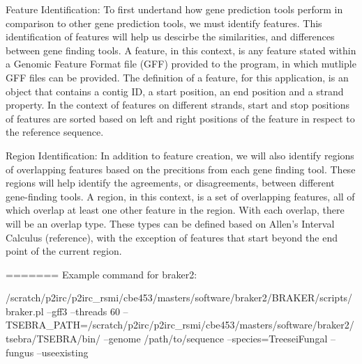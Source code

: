 Feature Identification: To first undertand how gene prediction tools
perform in comparison to other gene prediction tools, we must identify
features. This identification of features will help us descirbe the
similarities, and differences between gene finding tools. A feature,
in this context, is any feature stated within a Genomic Feature Format
file (GFF) provided to the program, in which mutliple GFF files can be
provided. The definition of a feature, for this application, is an
object that contains a contig ID, a start position, an end position
and a strand property. In the context of features on different
strands, start and stop positions of features are sorted based on left
and right positions of the feature in respect to the reference
sequence.

Region Identification: In addition to feature creation, we will also
identify regions of overlapping features based on the precitions from
each gene finding tool. These regions will help identify the
agreements, or disagreements, between different gene-finding tools. A
region, in this context, is a set of overlapping features, all of
which overlap at least one other feature in the region. With each
overlap, there will be an overlap type. These types can be defined
based on Allen's Interval Calculus (reference), with the exception of
features that start beyond the end point of the current region.


=======
Example command for braker2:

/scratch/p2irc/p2irc\_rsmi/cbe453/masters/software/braker2/BRAKER/scripts/braker.pl
--gff3 --threads 60
--TSEBRA\_PATH=/scratch/p2irc/p2irc\_rsmi/cbe453/masters/software/braker2/tsebra/TSEBRA/bin/
--genome /path/to/sequence --species=TreeseiFungal --fungus
--useexisting

